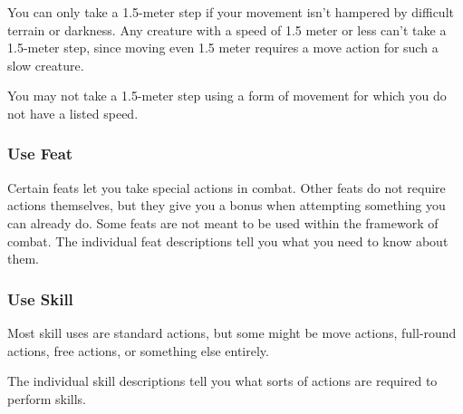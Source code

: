 You can only take a 1.5-meter step if your movement isn't hampered by difficult terrain or darkness. Any creature with a speed of 1.5 meter or less can't take a 1.5-meter step, since moving even 1.5 meter requires a move action for such a slow creature.

You may not take a 1.5-meter step using a form of movement for which you do not have a listed speed.

\subsubsection{Use Feat}
Certain feats let you take special actions in combat. Other feats do not require actions themselves, but they give you a bonus when attempting something you can already do. Some feats are not meant to be used within the framework of combat. The individual feat descriptions tell you what you need to know about them.

\subsubsection{Use Skill}
Most skill uses are standard actions, but some might be move actions, full-round actions, free actions, or something else entirely.

The individual skill descriptions tell you what sorts of actions are required to perform skills.